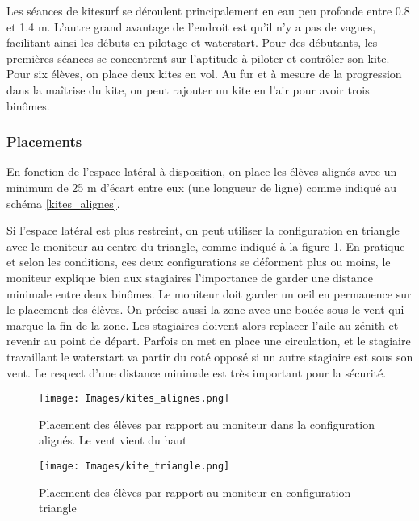 \documentclass[11pt,a4paper]{report}
\begin{document}
Les séances de kitesurf se déroulent principalement en eau peu profonde
entre 0.8 et 1.4 m. L'autre grand avantage de l'endroit est
qu'il n'y a pas de vagues, facilitant ainsi les débuts en pilotage
et waterstart.
Pour des débutants, les premières séances se concentrent sur l'aptitude
à piloter et contrôler son kite. Pour six élèves, on place deux kites en vol.
Au fur et à mesure de la progression dans la ma\^itrise du kite, 
on peut rajouter un kite en l'air pour avoir trois bin\^omes.

\subsubsection{Placements}

En fonction de l'espace latéral à disposition, on place les élèves
alignés avec un minimum de 25 m d'écart entre eux (une longueur de ligne) 
comme indiqué au schéma \ref{kites_alignes}.

Si l'espace latéral est plus restreint, on peut utiliser la configuration
en triangle avec le moniteur au centre du triangle, comme indiqué à la figure
\ref{kite_triangle}.
En pratique et selon les conditions, ces deux configurations se déforment plus ou moins, 
le moniteur explique bien aux stagiaires l'importance de garder une distance minimale 
entre deux binômes. Le moniteur doit garder un oeil en permanence sur le
placement des élèves. On précise aussi la zone avec une bouée sous le vent qui marque
la fin de la zone. Les stagiaires doivent alors replacer l'aile au zénith et 
revenir au point de départ. Parfois on met en place une circulation, 
et le stagiaire travaillant le waterstart va partir du coté opposé si 
un autre stagiaire est sous son  vent. Le respect d'une distance minimale est
très important pour la sécurité.


\begin{figure}
\begin{minipage}{0.4\textwidth}
\texttt{[image: Images/kites\_alignes.png]} 
\caption{Placement des élèves par rapport au moniteur dans la configuration
alignés\label{kites_alignes}. Le vent vient du haut}
\end{minipage}
\hfill
\begin{minipage}{0.4\textwidth}
\texttt{[image: Images/kite\_triangle.png]} 
\caption{Placement des élèves par rapport au moniteur en configuration
triangle\label{kite_triangle}}
\end{minipage}
\end{figure}
\end{document}
